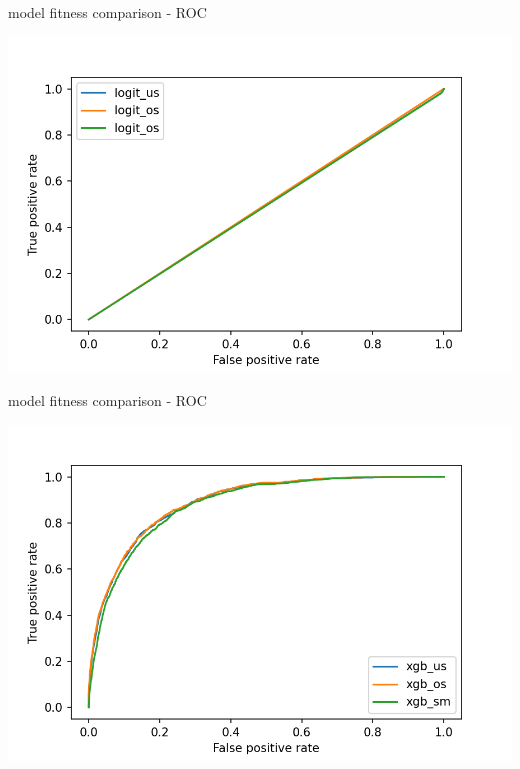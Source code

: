 \documentclass{beamer}
\begin{document}
\begin{frame}{model fitness comparison - ROC}

\begin{center}
\includegraphics[scale=0.65]{img/log_roc.png}
\end{center}
\end{frame}

\begin{frame}{model fitness comparison - ROC}

\begin{center}
\includegraphics[scale=0.65]{img/xgb_roc.png}
\end{center}
\end{frame}
\end{document}
